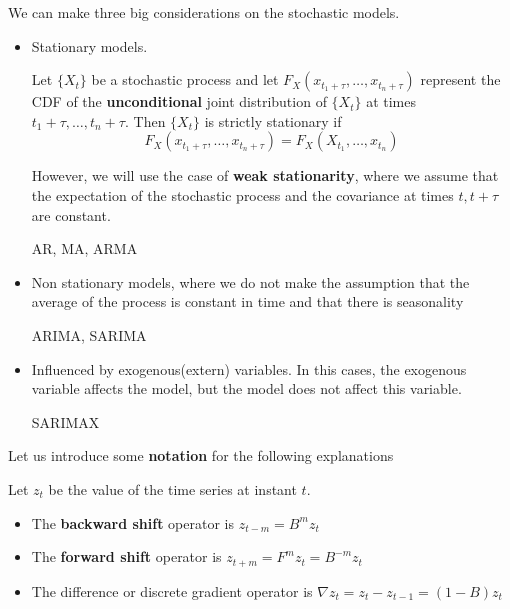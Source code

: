 We can make three big considerations on the stochastic models.
\begin{itemize}
  \item Stationary models.
        \begin{ndef}
          Let \(\{X_{t}\}\) be a stochastic process and let \(F_{X}\left(x_{t_{1} + \tau}, \dots, x_{t_{n} +\tau}\right)\) represent the CDF of the \textbf{unconditional} joint distribution of \(\{X_{t}\}\) at times \(t_{1 }+ \tau,\dots, t_{n} + \tau\). Then \(\{X_{t}\}\) is strictly stationary if
          \[
            F_{X}\left( x_{t_{1} + \tau}, \dots, x_{t_{n} +\tau}\right) = F_{X}\left(X_{t_{1}},\dots,x_{t_{n}}\right)
          \]

        \end{ndef}
        However, we will use the case of \textbf{weak stationarity}, where we assume that the expectation of the stochastic process and the covariance at times \(t,t+\tau\) are constant.

        \begin{example}
          AR, MA, ARMA
        \end{example}

  \item Non stationary models, where we do not make the assumption that the average of the process is constant in time and that there is seasonality
        \begin{example}
          ARIMA, SARIMA
        \end{example}

  \item Influenced by exogenous(extern) variables. In this cases, the exogenous variable affects the model, but the model does not affect this variable.
        \begin{example}
          SARIMAX
        \end{example}
\end{itemize}

Let us introduce some \textbf{notation} for the following explanations

\begin{ndef}
  Let \(z_{t}\) be the value of the time series at instant \(t\).
  \begin{itemize}
    \item The \textbf{backward shift} operator is \(z_{t-m} = B^{m}z_{t}\)
    \item The \textbf{forward shift} operator is \(z_{t+m} = F^{m}z_{t} = B^{-m}z_{t}\)
    \item The difference or discrete gradient operator is \(\nabla z_{t} = z_{t} - z_{t-1} = (1-B)z_{t}\)
  \end{itemize}
\end{ndef}

